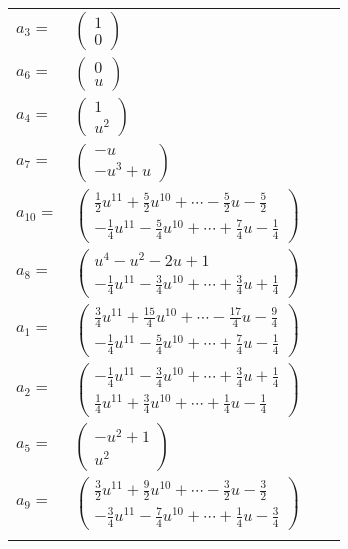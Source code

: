 \documentclass[1p]{elsarticle_modified}
\theoremstyle{definition}
\begin{document}
\begin{tabular}{m{7pt} m{180pt} m{7pt} m{180pt} }
\flushright $a_{3}=$&$\begin{pmatrix}1\\0\end{pmatrix}$ \\
\flushright $a_{6}=$&$\begin{pmatrix}0\\u\end{pmatrix}$ \\
\flushright $a_{4}=$&$\begin{pmatrix}1\\u^2\end{pmatrix}$ \\
\flushright $a_{7}=$&$\begin{pmatrix}- u\\- u^3+u\end{pmatrix}$ \\
\flushright $a_{10}=$&$\begin{pmatrix}\frac{1}{2} u^{11}+\frac{5}{2} u^{10}+\cdots-\frac{5}{2} u-\frac{5}{2}\\-\frac{1}{4} u^{11}-\frac{5}{4} u^{10}+\cdots+\frac{7}{4} u-\frac{1}{4}\end{pmatrix}$ \\
\flushright $a_{8}=$&$\begin{pmatrix}u^4- u^2-2 u+1\\-\frac{1}{4} u^{11}-\frac{3}{4} u^{10}+\cdots+\frac{3}{4} u+\frac{1}{4}\end{pmatrix}$ \\
\flushright $a_{1}=$&$\begin{pmatrix}\frac{3}{4} u^{11}+\frac{15}{4} u^{10}+\cdots-\frac{17}{4} u-\frac{9}{4}\\-\frac{1}{4} u^{11}-\frac{5}{4} u^{10}+\cdots+\frac{7}{4} u-\frac{1}{4}\end{pmatrix}$ \\
\flushright $a_{2}=$&$\begin{pmatrix}-\frac{1}{4} u^{11}-\frac{3}{4} u^{10}+\cdots+\frac{3}{4} u+\frac{1}{4}\\\frac{1}{4} u^{11}+\frac{3}{4} u^{10}+\cdots+\frac{1}{4} u-\frac{1}{4}\end{pmatrix}$ \\
\flushright $a_{5}=$&$\begin{pmatrix}- u^2+1\\u^2\end{pmatrix}$ \\
\flushright $a_{9}=$&$\begin{pmatrix}\frac{3}{2} u^{11}+\frac{9}{2} u^{10}+\cdots-\frac{3}{2} u-\frac{3}{2}\\-\frac{3}{4} u^{11}-\frac{7}{4} u^{10}+\cdots+\frac{1}{4} u-\frac{3}{4}\end{pmatrix}$\\&\end{tabular}
\end{document}
